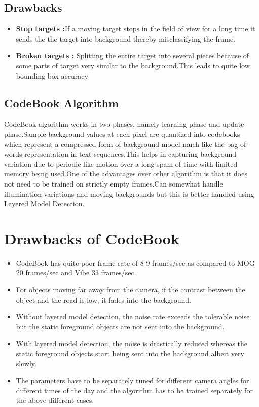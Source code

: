 \documentclass[12pt,a4paper]{article}
\begin{document}
\subsection{Drawbacks}
\begin{itemize}
\item {\bf Stop targets :}If a moving target stops in the field of view for a long time it sends the the target into background thereby misclassifying the frame.
\item {\bf Broken targets :} Splitting the entire target into several pieces because of some parts of target very similar to the background.This leads to quite low bounding box-accuracy  
\end{itemize} 

\subsection{CodeBook Algorithm}
CodeBook algorithm works in two phases, namely learning phase and update phase.Sample background values at each pixel are quantized into codebooks which represent a compressed form of background model much like the bag-of-words representation in text sequences.This helps in capturing background variation due to periodic like motion over a long spam of time with limited memory being used.One of the advantages over other algorithm is that it does not need to be trained on strictly empty frames.Can somewhat handle illumination variations and moving backgrounds but this is better handled using Layered Model Detection.

\section{Drawbacks of CodeBook}
\begin{itemize}
\item CodeBook has quite poor frame rate of 8-9 frames/sec as compared to MOG 20 frames/sec and Vibe 33 frames/sec. 
\item For objects moving far away from the camera, if the contrast between the object and the road is low, it fades into the background.
\item Without layered model detection, the noise rate exceeds the tolerable noise but the static foreground objects are not sent into the background.
\item With layered model detection, the noise is drastically reduced whereas the static foreground objects start being sent into the background albeit very slowly.
\item The parameters have to be separately tuned for different camera angles for different times of the day and the algorithm has to be trained separately for the above different cases.
\end{itemize}
\end{document}
